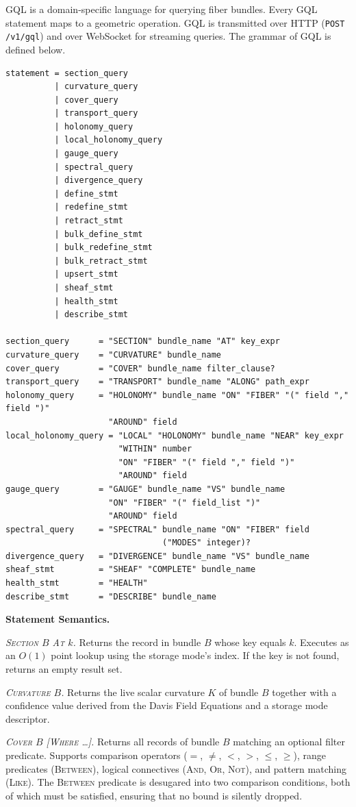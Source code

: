 \documentclass[11pt,letterpaper]{article}
\begin{document}
GQL is a domain-specific language for querying fiber bundles. Every GQL statement maps to a geometric operation. GQL is transmitted over HTTP (\texttt{POST /v1/gql}) and over WebSocket for streaming queries. The grammar of GQL is defined below.

\begin{lstlisting}
statement = section_query
          | curvature_query
          | cover_query
          | transport_query
          | holonomy_query
          | local_holonomy_query
          | gauge_query
          | spectral_query
          | divergence_query
          | define_stmt
          | redefine_stmt
          | retract_stmt
          | bulk_define_stmt
          | bulk_redefine_stmt
          | bulk_retract_stmt
          | upsert_stmt
          | sheaf_stmt
          | health_stmt
          | describe_stmt

section_query      = "SECTION" bundle_name "AT" key_expr
curvature_query    = "CURVATURE" bundle_name
cover_query        = "COVER" bundle_name filter_clause?
transport_query    = "TRANSPORT" bundle_name "ALONG" path_expr
holonomy_query     = "HOLONOMY" bundle_name "ON" "FIBER" "(" field "," field ")"
                     "AROUND" field
local_holonomy_query = "LOCAL" "HOLONOMY" bundle_name "NEAR" key_expr
                       "WITHIN" number
                       "ON" "FIBER" "(" field "," field ")"
                       "AROUND" field
gauge_query        = "GAUGE" bundle_name "VS" bundle_name
                     "ON" "FIBER" "(" field_list ")"
                     "AROUND" field
spectral_query     = "SPECTRAL" bundle_name "ON" "FIBER" field
                                ("MODES" integer)?
divergence_query   = "DIVERGENCE" bundle_name "VS" bundle_name
sheaf_stmt         = "SHEAF" "COMPLETE" bundle_name
health_stmt        = "HEALTH"
describe_stmt      = "DESCRIBE" bundle_name
\end{lstlisting}

\textbf{Statement Semantics.}

\textit{\textsc{Section} $B$ \textsc{At} $k$.} Returns the record in bundle $B$ whose key equals $k$. Executes as an $O(1)$ point lookup using the storage mode's index. If the key is not found, returns an empty result set.

\textit{\textsc{Curvature} $B$.} Returns the live scalar curvature $K$ of bundle $B$ together with a confidence value derived from the Davis Field Equations and a storage mode descriptor.

\textit{\textsc{Cover} $B$ [\textsc{Where} \ldots].} Returns all records of bundle $B$ matching an optional filter predicate. Supports comparison operators ($=$, $\neq$, $<$, $>$, $\leq$, $\geq$), range predicates (\textsc{Between}), logical connectives (\textsc{And}, \textsc{Or}, \textsc{Not}), and pattern matching (\textsc{Like}). The \textsc{Between} predicate is desugared into two comparison conditions, both of which must be satisfied, ensuring that no bound is silently dropped.
\end{document}
